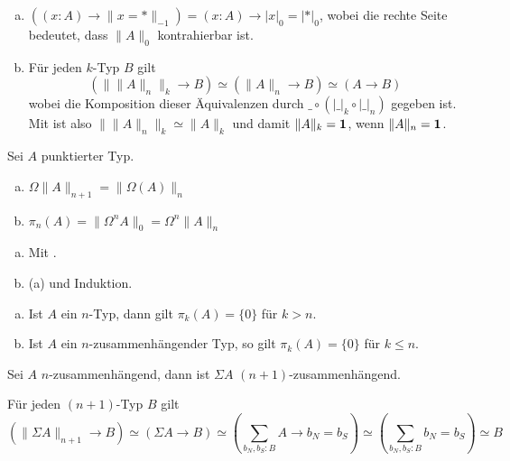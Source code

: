 \begin{beweis}
  \begin{enumerate}[(a)]
  \item \(((x:A)\to \|x=\ast\|_{-1}) = (x:A)\to |x|_0=|{\ast}|_0\),
  wobei die rechte Seite bedeutet, dass \(\|A\|_0\) kontrahierbar ist.
  \item Für jeden \(k\)-Typ \(B\) gilt
  \[(\|\|A\|_n\|_k\to B)\simeq (\|A\|_n\to B)\simeq (A\to B)\]
  wobei die Komposition dieser Äquivalenzen durch \(\_\circ (|\_|_k \circ |\_|_n)\) gegeben ist.
  Mit  ist also \(\|\|A\|_n\|_k\simeq \|A\|_k\) und damit \(\|A\|_k=\mathbf{1}\), wenn \(\|A\|_n=\mathbf{1}\).
  \end{enumerate}
\end{beweis}

\begin{lemma}
  Sei \(A\) punktierter Typ.
  \begin{enumerate}[(a)]
  \item \(\Omega\|A\|_{n+1}=\|\Omega(A)\|_n\)
  \item \(\pi_n(A)=\|\Omega^nA\|_0=\Omega^n\|A\|_n\)
  \end{enumerate}
\end{lemma}

\begin{beweis}
  \begin{enumerate}[(a)]
  \item Mit .
  \item (a) und Induktion.
  \end{enumerate}
\end{beweis}

\begin{lemma}
  \begin{enumerate}[(a)]
  \item Ist \(A\) ein \(n\)-Typ, dann gilt \(\pi_k(A)=\{0\}\) für \(k>n\).
  \item Ist \(A\) ein \(n\)-zusammenhängender Typ, so gilt \(\pi_k(A)=\{0\}\) für \(k\leq n\).
  \end{enumerate}
\end{lemma}

\begin{satz}
  Sei \(A\) \(n\)-zusammenhängend, dann ist \(\Sigma A\) \((n+1)\)-zusammenhängend.
\end{satz}

\begin{beweis}
  Für jeden \((n+1)\)-Typ \(B\) gilt
  \[(\|\Sigma A\|_{n+1}\to B)\simeq (\Sigma A\to B) \simeq \left(\sum_{b_N,b_S:B}A\to b_N=b_S\right)\simeq \left(\sum_{b_N,b_S:B}b_N=b_S\right)\simeq B\]
\end{beweis}

